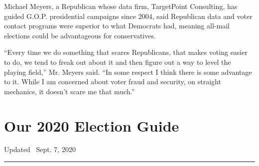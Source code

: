 Michael Meyers, a Republican whose data firm, TargetPoint Consulting,
has guided G.O.P. presidential campaigns since 2004, said Republican
data and voter contact programs were superior to what Democrats had,
meaning all-mail elections could be advantageous for conservatives.

``Every time we do something that scares Republicans, that makes voting
easier to do, we tend to freak out about it and then figure out a way to
level the playing field,'' Mr. Meyers said. ``In some respect I think
there is some advantage to it. While I am concerned about voter fraud
and security, on straight mechanics, it doesn't scare me that much.''

\hypertarget{our-2020-election-guide}{%
\section{Our 2020 Election Guide}\label{our-2020-election-guide}}

Updated ~Sept. 7, 2020

\begin{center}\rule{0.5\linewidth}{\linethickness}\end{center}

